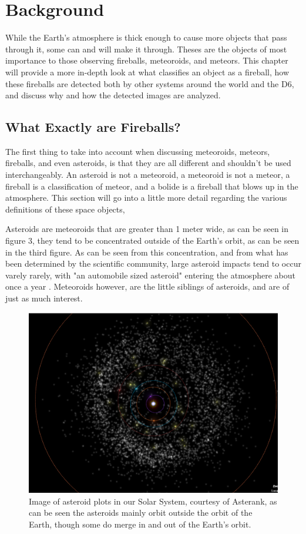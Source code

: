 \chapter{Background}

While the Earth's atmosphere is thick enough to cause more objects that pass through it, some can and will make it through. Theses are the objects of most importance to those observing fireballs, meteoroids, and meteors. This chapter will provide a more in-depth look at what classifies an object as a fireball, how these fireballs are detected both by other systems around the world and the D6, and discuss why and how the detected images are analyzed.

\section{What Exactly are Fireballs?}

The first thing to take into account when discussing meteoroids, meteors, fireballs, and even asteroids, is that they are all different and shouldn't be used interchangeably. 
An asteroid is not a meteoroid, a meteoroid is not a meteor, a fireball is a classification of meteor, and a bolide is a fireball that blows up in the atmosphere. 
This section will go into a little more detail regarding the various definitions of these space objects, 

Asteroids are meteoroids that are greater than 1 meter wide, as can be seen in figure 3, they tend to be concentrated outside of the Earth's orbit, as can be seen in the third figure.
As can be seen from this concentration, and from what has been determined by the scientific community, large asteroid impacts tend to occur varely rarely, with "an automobile sized asteroid" entering the atmosphere about once a year \cite{atkinson_2018}. 
Meteoroids however, are the little siblings of asteroids, and are of just as much interest.

\begin{figure}
    \centering
    \includegraphics[width=12cm]{Solar-System-Asteroids.png}
    \centering
    \caption{Image of asteroid plots in our Solar System, courtesy of Asterank, as can be seen the asteroids mainly orbit outside the orbit of the Earth, though some do merge in and out of the Earth's orbit.}
    \label{Figure 3}
\end{figure}

